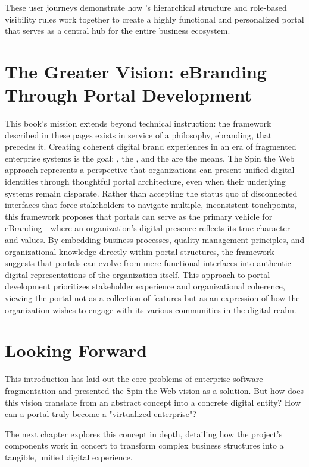 These user journeys demonstrate how \wbol{}'s hierarchical structure and role-based visibility rules work together to create a highly functional and personalized portal that serves as a central hub for the entire business ecosystem.

\section{The Greater Vision: eBranding Through Portal Development}
\label{sec:ebranding-vision}

This book's mission extends beyond technical instruction: the framework described in these pages exists in service of a philosophy, \gls{ebranding}, that precedes it. Creating coherent digital brand experiences in an era of fragmented enterprise systems is the goal; \wbol{}, the \webspinner{}, and the \studio{} are the means. The Spin the Web approach represents a perspective that organizations can present unified digital identities through thoughtful portal architecture, even when their underlying systems remain disparate. Rather than accepting the status quo of disconnected interfaces that force stakeholders to navigate multiple, inconsistent touchpoints, this framework proposes that portals can serve as the primary vehicle for eBranding—where an organization's digital presence reflects its true character and values. By embedding business processes, quality management principles, and organizational knowledge directly within portal structures, the framework suggests that portals can evolve from mere functional interfaces into authentic digital representations of the organization itself. This approach to portal development prioritizes stakeholder experience and organizational coherence, viewing the portal not as a collection of features but as an expression of how the organization wishes to engage with its various communities in the digital realm.

\section{Looking Forward}
\label{sec:looking-forward}

This introduction has laid out the core problems of enterprise software fragmentation and presented the Spin the Web vision as a solution. But how does this vision translate from an abstract concept into a concrete digital entity? How can a portal truly become a "virtualized enterprise"?

The next chapter explores this concept in depth, detailing how the project's components work in concert to transform complex business structures into a tangible, unified digital experience.
